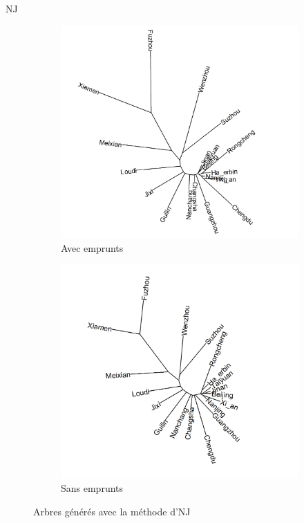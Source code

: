 \documentclass[11pt]{beamer}
\begin{document}
\begin{frame}{NJ}
\begin{figure}[htbp]
\flushleft
\begin{subfigure}{.4\textwidth}
\centering
\includegraphics[scale=.12]{Figure/NJ_with}
\caption{Avec emprunts}
\end{subfigure}
\begin{subfigure}{.4\textwidth}
\centering
\includegraphics[scale=.15]{Figure/NJ_without}
\caption{Sans emprunts}
\end{subfigure}
\caption{Arbres générés avec la méthode d'NJ}
\label{Fig:NJ}
\end{figure}
\end{frame}
\end{document}
